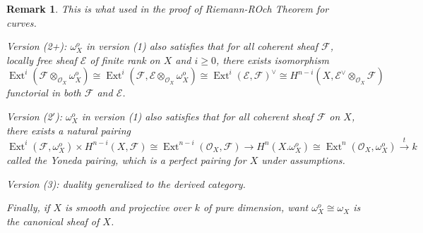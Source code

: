 \documentclass{ctexart}
\newtheorem{remark}{Remark}[section]
\newcommand{\ext}{\operatorname{Ext}}
\begin{document}
\begin{remark}
    This is what used in the proof of Riemann-ROch Theorem for curves.
    \par
    Version (2+): $\omega_{X}^{o}$ in version (1) also satisfies that for all coherent sheaf $\mathcal{F}$, locally free sheaf $\mathcal{E}$ of finite rank on $X$ and $i \ge 0$,
    there exists isomorphism 
    \begin{equation*}
        \ext^{i}(\mathcal{F} \otimes_{\mathcal{O}_{X}} \omega_{X}^{o}) \cong \ext^{i}(\mathcal{F}, \mathcal{E} \otimes_{\mathcal{O}_{X}} \omega_{X}^{o}) \cong \ext^{i}(\mathcal{E}, \mathcal{F})^{\lor} \cong H^{n - i}(X, \mathcal{E}^{\lor} \otimes_{\mathcal{O}_{X}} \mathcal{F})  
    \end{equation*}
    functorial in both $\mathcal{F}$ and $\mathcal{E}$.
    \par
    Version (2$'$): $\omega_{X}^{o}$ in version (1) also satisfies that for all coherent sheaf $\mathcal{F}$ on $X$,
    there exists a natural pairing 
    \begin{equation*}
        \ext^{i}(\mathcal{F}, \omega_{X}^{o}) \times H^{n - i}(X, \mathcal{F}) \cong \ext^{n - i}(\mathcal{O}_{X}, \mathcal{F}) \longrightarrow H^{n}(X. \omega_{X}^{o}) \cong \ext^{n}(\mathcal{O}_{X}, \omega_{X}^{o}) \overset{t}{\longrightarrow} k
    \end{equation*}
    called the Yoneda pairing, which is a perfect pairing for $X$ under assumptions.
    \par
    Version (3): duality generalized to the derived category.
    \par
    Finally, if $X$ is smooth and projective over $k$ of pure dimension, want $\omega_{X}^{o} \cong \omega_{X}$ is the canonical sheaf of $X$.
\end{remark}
\end{document}
